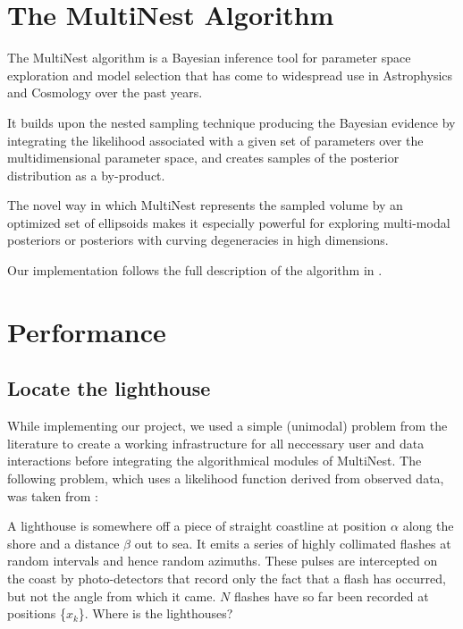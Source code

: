 \documentclass{article}
\begin{document}
\section{The MultiNest Algorithm}
The MultiNest algorithm is a Bayesian inference tool for parameter space exploration and model selection that has come to widespread use in Astrophysics and Cosmology over the past years. 

It builds upon the nested sampling technique producing the Bayesian evidence by integrating the likelihood associated with a given set of parameters over the multidimensional parameter space, and creates samples of the posterior distribution as a by-product.

The novel way in which MultiNest represents the sampled volume by an optimized set of ellipsoids makes it especially powerful for exploring multi-modal posteriors or posteriors with curving degeneracies in high dimensions.

Our implementation follows the full description of the algorithm in \cite{2009MNRAS.398.1601F}.
\section{Performance}

\subsection{Locate the lighthouse}

While implementing our project, we used a simple (unimodal) problem from the literature to create a working infrastructure for all neccessary user and data interactions before integrating the algorithmical modules of MultiNest.  The following problem, which uses a likelihood function derived from observed data, was taken from \cite{Siv2006}:

\vspace{0.2cm}

\begin{adjustwidth*}{1.2cm}{2.cm}
A lighthouse is somewhere off a piece of straight coastline at position $\alpha$ along the shore and a distance $\beta$ out to sea. It emits a series of highly collimated flashes at random intervals and hence random azimuths. These pulses are intercepted on the coast by photo-detectors that record only the fact that a flash has occurred, but not the angle from which it came. $N$ flashes have so far been recorded at positions \{$x_k$\}. Where is the lighthouses?
 \end{adjustwidth*}
 
\end{document}
